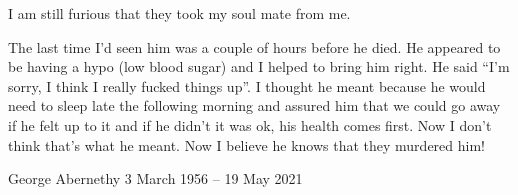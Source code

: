I am still furious that they took my soul mate from me.

The last time I’d seen him was a couple of hours before he died. He appeared to
be having a hypo (low blood sugar) and I helped to bring him right. He said “I’m
sorry, I think I really fucked things up”. I thought he meant because he would
need to sleep late the following morning and assured him that we could go away
if he felt up to it and if he didn’t it was ok, his health comes first. Now I
don’t think that’s what he meant. Now I believe he knows that they murdered him!

George Abernethy 3 March 1956 – 19 May 2021

